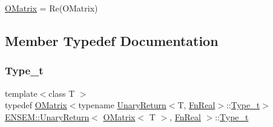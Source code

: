 \mbox{\hyperlink{classENSEM_1_1OMatrix}{O\+Matrix}} = Re(\+O\+Matrix) 

\subsection{Member Typedef Documentation}
\mbox{\label{structENSEM_1_1UnaryReturn_3_01OMatrix_3_01T_01_4_00_01FnReal_01_4_a060b381191f238b0c1dc9189a3a14c6d}} 
\subsubsection{\texorpdfstring{Type\_t}{Type\_t}\hspace{0.1cm}{\footnotesize\ttfamily [1/2]}}
{\footnotesize\ttfamily template$<$class T $>$ \\
typedef \mbox{\hyperlink{classENSEM_1_1OMatrix}{O\+Matrix}}$<$typename \mbox{\hyperlink{structENSEM_1_1UnaryReturn}{Unary\+Return}}$<$T, \mbox{\hyperlink{structENSEM_1_1FnReal}{Fn\+Real}}$>$\+::\mbox{\hyperlink{structENSEM_1_1UnaryReturn_3_01OMatrix_3_01T_01_4_00_01FnReal_01_4_a060b381191f238b0c1dc9189a3a14c6d}{Type\+\_\+t}}$>$ \mbox{\hyperlink{structENSEM_1_1UnaryReturn}{E\+N\+S\+E\+M\+::\+Unary\+Return}}$<$ \mbox{\hyperlink{classENSEM_1_1OMatrix}{O\+Matrix}}$<$ T $>$, \mbox{\hyperlink{structENSEM_1_1FnReal}{Fn\+Real}} $>$\+::\mbox{\hyperlink{structENSEM_1_1UnaryReturn_3_01OMatrix_3_01T_01_4_00_01FnReal_01_4_a060b381191f238b0c1dc9189a3a14c6d}{Type\+\_\+t}}}

\mbox{\label{structENSEM_1_1UnaryReturn_3_01OMatrix_3_01T_01_4_00_01FnReal_01_4_a060b381191f238b0c1dc9189a3a14c6d}} 
